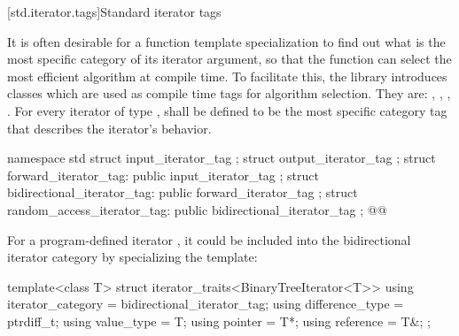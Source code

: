 [std.iterator.tags]{Standard iterator tags}


\pnum
{}%
%
%
%
%
%
It is often desirable for a
function template specialization
to find out what is the most specific category of its iterator
argument, so that the function can select the most efficient algorithm at compile time.
To facilitate this, the
library introduces
classes which are used as compile time tags for algorithm selection.
They are:
,
,
,
.
For every iterator of type
,
shall be defined to be the most specific category tag that describes the
iterator's behavior. 

\begin{codeblock}
namespace std {
  struct input_iterator_tag { };
  struct output_iterator_tag { };
  struct forward_iterator_tag: public input_iterator_tag { };
  struct bidirectional_iterator_tag: public forward_iterator_tag { };
  struct random_access_iterator_tag: public bidirectional_iterator_tag { };
  @@
}
\end{codeblock}

\pnum
{}%
%
%
%
%
%
%
\begin{example}
For a program-defined iterator
,
it could be included
into the bidirectional iterator category by specializing the
template:

\begin{codeblock}
template<class T> struct iterator_traits<BinaryTreeIterator<T>> {
  using iterator_category = bidirectional_iterator_tag;
  using difference_type   = ptrdiff_t;
  using value_type        = T;
  using pointer           = T*;
  using reference         = T&;
};
\end{codeblock}
\end{example}

